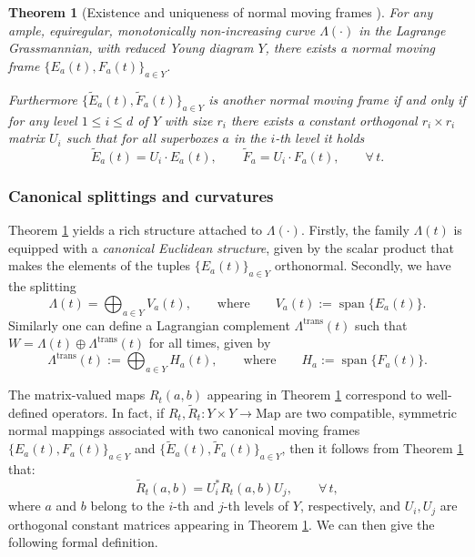 \documentclass[11pt,a4paper]{article}
\theoremstyle{plain}
\newtheorem{theorem}{Theorem}[section]
\theoremstyle{definition}
\theoremstyle{remark}
\numberwithin{equation}{section}
\DeclareMathOperator{\spn}{\mathrm{span}}
\begin{document}
\begin{theorem}[Existence and uniqueness of normal moving frames \cite{ZeLi}]\label{t:ZeLi}
For any ample, equiregular, monotonically non-increasing curve $\Lambda(\cdot)$ in the Lagrange Grassmannian, with reduced Young diagram $Y$, there exists a normal moving frame $\{E_a(t),F_a(t)\}_{a\in Y}$.

Furthermore $\{\tilde{E}_a(t),\tilde{F}_a(t)\}_{a\in Y}$ is another normal moving frame if and only if for any level $1\leq i\leq d$ of $Y$ with size $r_i$ there exists a constant orthogonal $r_i\times r_i$ matrix $U_i$ such that for all superboxes $a$ in the $i$-th level it holds
\begin{equation}
\tilde{E}_a(t) = U_i \cdot E_a(t),\qquad \tilde{F}_a = U_i \cdot F_a(t), \qquad \forall\, t.
\end{equation}
\end{theorem}



\subsubsection{Canonical splittings and curvatures}
Theorem \ref{t:ZeLi} yields a rich structure attached to $\Lambda(\cdot)$. Firstly, the family $\Lambda(t)$ is equipped with a \emph{canonical Euclidean structure}, given by the scalar product that makes the elements of the tuples $\{E_a(t)\}_{a\in Y}$ orthonormal. Secondly, we have the splitting
\begin{equation}
\Lambda(t) = \bigoplus_{a\in Y} V_a(t), \qquad \text{where} \qquad V_a(t) := \spn\{E_a(t)\}.
\end{equation}
Similarly one can define a Lagrangian complement $\Lambda^{\mathrm{trans}}(t)$ such that $W=\Lambda(t) \oplus \Lambda^{\mathrm{trans}}(t)$ for all times, given by
\begin{equation}
\Lambda^{\mathrm{trans}}(t) := \bigoplus_{a\in Y} H_a(t), \qquad \text{where} \qquad H_a:=\spn\{F_a(t)\}.
\end{equation}

The matrix-valued maps $R_t(a,b)$ appearing in Theorem \ref{t:ZeLi} correspond to well-defined operators. In fact, if $R_t, \tilde{R}_t: Y\times Y \to \mathrm{Map}$ are two compatible, symmetric normal mappings associated with two canonical moving frames $\{E_a(t),F_a(t)\}_{a\in Y}$ and $\{\tilde{E}_a(t),\tilde{F}_a(t)\}_{a\in Y}$, then it follows from Theorem \ref{t:ZeLi} that:
\begin{equation}
\tilde{R}_t(a,b) = U_i^*  R_t(a,b)  U_j, \qquad \forall\, t,
\end{equation}
where $a$ and $b$ belong to the $i$-th and $j$-th levels of $Y$, respectively, and $U_i,U_j$ are orthogonal constant matrices appearing in Theorem \ref{t:ZeLi}. We can then give the following formal definition.
\end{document}
